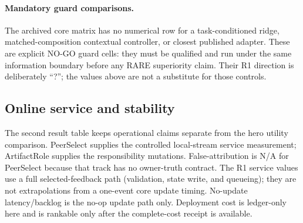 \documentclass[sigconf,anonymous]{aamas}
\begin{document}
\paragraph{Mandatory guard comparisons.} The archived core matrix has no numerical row for a task-conditioned ridge, matched-composition contextual controller, or closest published adapter. These are explicit NO-GO guard cells: they must be qualified and run under the same information boundary before any RARE superiority claim. Their R1 direction is deliberately ``?''; the values above are not a substitute for those controls.

\subsection{Online service and stability}

The second result table keeps operational claims separate from the hero utility comparison. PeerSelect supplies the controlled local-stream service measurement; ArtifactRole supplies the responsibility mutations. False-attribution is N/A for PeerSelect because that track has no owner-truth contract. The R1 service values use a full selected-feedback path (validation, state write, and queueing); they are not extrapolations from a one-event core update timing. No-update latency/backlog is the no-op update path only. Deployment cost is ledger-only here and is rankable only after the complete-cost receipt is available.
\end{document}
